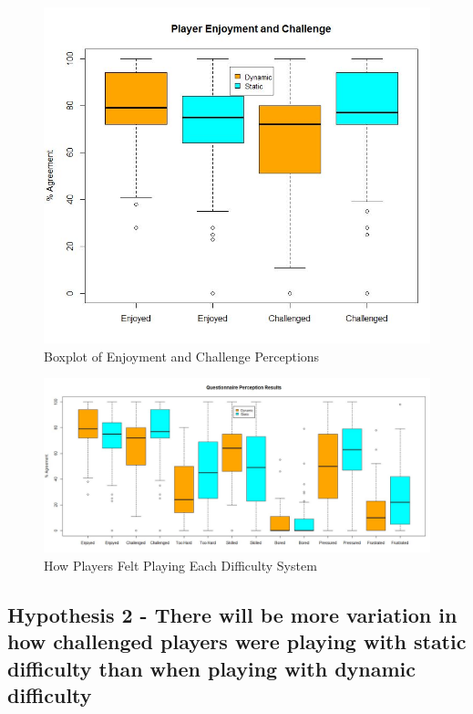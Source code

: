 \documentclass[journal]{IEEEtran}
\begin{document}
\begin{figure}[h]
	\includegraphics[width=1.0\linewidth]{playerenjoymentandchallenge.jpg}
	\caption{Boxplot of Enjoyment and Challenge Perceptions}
	\label{Analysis Test}
\end{figure} 

\begin{figure}[h]
	\includegraphics[width=1.0\linewidth]{questionnaireboxplot.jpg}
	\caption{How Players Felt Playing Each Difficulty System}
	\label{Analysis Test}
\end{figure} 





\subsection{Hypothesis 2 - There will be more variation in how challenged players were playing with static difficulty than when playing with dynamic difficulty}
\end{document}

